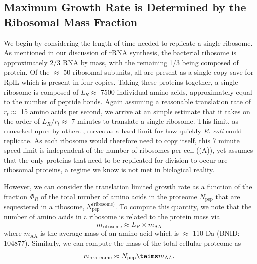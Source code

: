 \subsection{Maximum Growth Rate is Determined by the Ribosomal Mass Fraction}
We begin by considering the length of time needed to replicate a single
ribosome. As mentioned in our discussion of rRNA synthesis, the bacterial
ribosome is approximately 2/3 RNA by mass, with the remaining 1/3 being composed
of protein. Of the $\approx$ 50 ribosomal subunits, all are present as a single
copy save for RplL which is present in four copies. Taking these proteins
together, a single ribosome is composed of $L_R \approx$ 7500 individual amino
acids, approximately equal to the number of peptide bonds. Again assuming a
reasonable translation rate of $r_t \approx$ 15 amino acids per second, we arrive at
an simple estimate that it takes on the order of  $L_R / r_t \approx$ 7 minutes to
translate a single ribosome. This limit, as remarked upon by others
\citep{dill2011}, serves as a hard limit for how quickly \textit{E. coli} could
replicate. As each ribosome would therefore need to copy itself, this  7 minute
speed limit is independent of the number of ribosomes per cell
((A)), yet assumes that the only proteins that need
to be replicated for division to occur are ribosomal proteins, a regime we know is not met in
biological reality. 

However, we can consider the translation limited growth rate as a function of
the fraction $\Phi_R$ of the total number of amino acids in the proteome $N_\text{pep}$
that are sequestered in a ribosome, $N_\text{pep}^\text{(ribosome)}$. To compute this quantity, we
note that the number of amino acids in a ribosome is related to the protein mass
via 
\begin{equation}
  m_\text{ribosome} \approx L_R \times m_\text{AA}
  \label{eq:mribo}
\end{equation}
where $m_\text{AA}$ is the average mass of an amino acid which is $\approx$ 110
Da (BNID: 104877). Similarly, we can compute the mass of the total cellular
proteome as 
\begin{equation}
  m_\text{proteome} \approx N_\text{pep} \teims m_\text{AA}.
  \label{eq:mproteome}
\end{equation}

